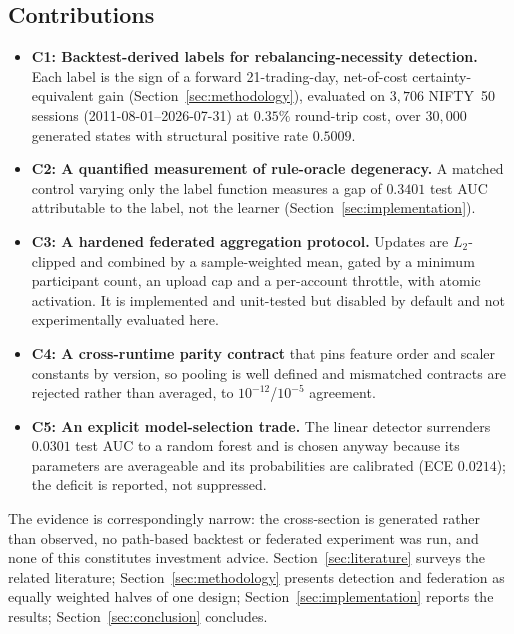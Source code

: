 \subsection{Contributions}
\begin{itemize}
\item \textbf{C1: Backtest-derived labels for rebalancing-necessity detection.}
Each label is the sign of a forward 21-trading-day, net-of-cost
certainty-equivalent gain (Section~\ref{sec:methodology}), evaluated on
$3{,}706$ NIFTY~50 sessions (2011-08-01--2026-07-31) at $0.35\%$ round-trip
cost, over $30{,}000$ generated states with structural positive rate $0.5009$.
\item \textbf{C2: A quantified measurement of rule-oracle degeneracy.} A
matched control varying only the label function measures a gap of $0.3401$
test AUC attributable to the label, not the learner (Section~\ref{sec:implementation}).
\item \textbf{C3: A hardened federated aggregation protocol.} Updates are
$L_2$-clipped and combined by a sample-weighted mean, gated by a minimum
participant count, an upload cap and a per-account throttle, with atomic
activation. It is implemented and unit-tested but disabled by default and not
experimentally evaluated here.
\item \textbf{C4: A cross-runtime parity contract} that pins feature order and
scaler constants by version, so pooling is well defined and mismatched
contracts are rejected rather than averaged, to $10^{-12}$/$10^{-5}$ agreement.
\item \textbf{C5: An explicit model-selection trade.} The linear detector
surrenders $0.0301$ test AUC to a random forest and is chosen anyway because
its parameters are averageable and its probabilities are calibrated (ECE
$0.0214$); the deficit is reported, not suppressed.
\end{itemize}

The evidence is correspondingly narrow: the cross-section is generated rather
than observed, no path-based backtest or federated experiment was run, and
none of this constitutes investment advice. Section~\ref{sec:literature}
surveys the related literature; Section~\ref{sec:methodology} presents
detection and federation as equally weighted halves of one design;
Section~\ref{sec:implementation} reports the results; Section~\ref{sec:conclusion}
concludes.
